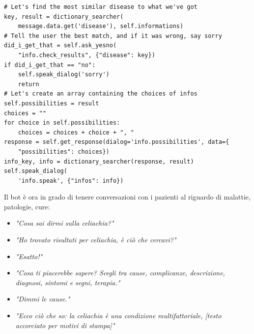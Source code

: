 \begin{verbatim}
# Let's find the most similar disease to what we've got
key, result = dictionary_searcher(
    message.data.get('disease'), self.informations)
# Tell the user the best match, and if it was wrong, say sorry
did_i_get_that = self.ask_yesno(
    "info.check_results", {"disease": key})
if did_i_get_that == "no":
    self.speak_dialog('sorry')
    return
# Let's create an array containing the choices of infos
self.possibilities = result
choices = ""
for choice in self.possibilities:
    choices = choices + choice + ", "
response = self.get_response(dialog='info.possibilities', data={
    "possibilities": choices})
info_key, info = dictionary_searcher(response, result)
self.speak_dialog(
    'info.speak', {"infos": info})
\end{verbatim}
Il bot è ora in grado di tenere conversazioni con i pazienti al riguardo di malattie, patologie, cure:
\begin{itemize}
    \item \textit{"Cosa sai dirmi sulla celiachia?"}
    \item \textit{"Ho trovato risultati per celiachia, è ciò che cercavi?"}
    \item \textit{"Esatto!"}
    \item \textit{"Cosa ti piacerebbe sapere? Scegli tra cause, complicanze, descrizione, diagnosi, sintomi e segni, terapia."}
    \item \textit{"Dimmi le cause."}
    \item \textit{"Ecco ciò che so: la celiachia è una condizione multifattoriale, [testo accorciato per motivi di stampa]"}
\end{itemize}
